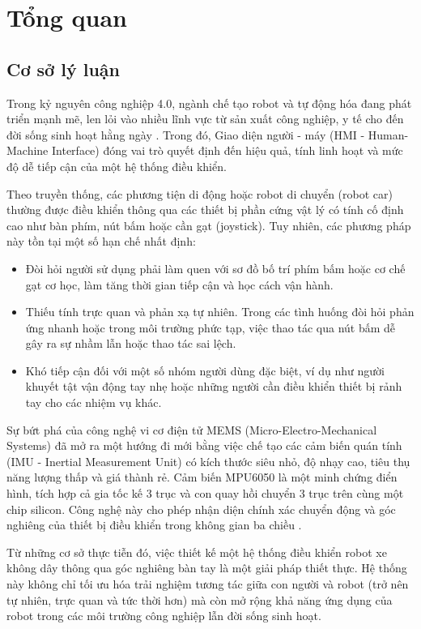 
\chapter{Tổng quan}

\section{Cơ sở lý luận}
Trong kỷ nguyên công nghiệp 4.0, ngành chế tạo robot và tự động hóa đang phát triển mạnh mẽ, len lỏi vào nhiều lĩnh vực từ sản xuất công nghiệp, y tế cho đến đời sống sinh hoạt hằng ngày \cite{marwedel2021embedded}. Trong đó, Giao diện người - máy (HMI - Human-Machine Interface) đóng vai trò quyết định đến hiệu quả, tính linh hoạt và mức độ dễ tiếp cận của một hệ thống điều khiển.

Theo truyền thống, các phương tiện di động hoặc robot di chuyển (robot car) thường được điều khiển thông qua các thiết bị phần cứng vật lý có tính cố định cao như bàn phím, nút bấm hoặc cần gạt (joystick). Tuy nhiên, các phương pháp này tồn tại một số hạn chế nhất định:
\begin{itemize}
    \item Đòi hỏi người sử dụng phải làm quen với sơ đồ bố trí phím bấm hoặc cơ chế gạt cơ học, làm tăng thời gian tiếp cận và học cách vận hành.
    \item Thiếu tính trực quan và phản xạ tự nhiên. Trong các tình huống đòi hỏi phản ứng nhanh hoặc trong môi trường phức tạp, việc thao tác qua nút bấm dễ gây ra sự nhầm lẫn hoặc thao tác sai lệch.
    \item Khó tiếp cận đối với một số nhóm người dùng đặc biệt, ví dụ như người khuyết tật vận động tay nhẹ hoặc những người cần điều khiển thiết bị rảnh tay cho các nhiệm vụ khác.
\end{itemize}

Sự bứt phá của công nghệ vi cơ điện tử MEMS (Micro-Electro-Mechanical Systems) \cite{serway2018physics} đã mở ra một hướng đi mới bằng việc chế tạo các cảm biến quán tính (IMU - Inertial Measurement Unit) có kích thước siêu nhỏ, độ nhạy cao, tiêu thụ năng lượng thấp và giá thành rẻ. Cảm biến MPU6050 là một minh chứng điển hình, tích hợp cả gia tốc kế 3 trục và con quay hồi chuyển 3 trục trên cùng một chip silicon. Công nghệ này cho phép nhận diện chính xác chuyển động và góc nghiêng của thiết bị điều khiển trong không gian ba chiều \cite{mpu6050-datasheet}.

Từ những cơ sở thực tiễn đó, việc thiết kế một hệ thống điều khiển robot xe không dây thông qua góc nghiêng bàn tay là một giải pháp thiết thực. Hệ thống này không chỉ tối ưu hóa trải nghiệm tương tác giữa con người và robot (trở nên tự nhiên, trực quan và tức thời hơn) mà còn mở rộng khả năng ứng dụng của robot trong các môi trường công nghiệp lẫn đời sống sinh hoạt.

